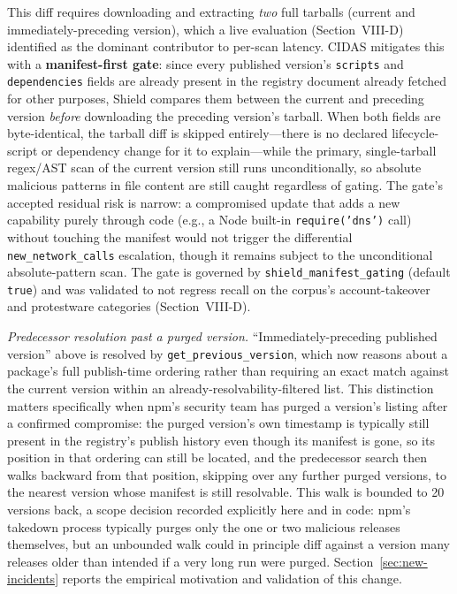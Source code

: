 \documentclass[journal]{IEEEtran}
\begin{document}
This diff requires downloading and extracting \emph{two} full tarballs (current and immediately-preceding
version), which a live evaluation (Section~VIII-D) identified as the dominant contributor to per-scan
latency. CIDAS mitigates this with a \textbf{manifest-first gate}: since every published version's
\texttt{scripts} and \texttt{dependencies} fields are already present in the registry document already
fetched for other purposes, Shield compares them between the current and preceding version \emph{before}
downloading the preceding version's tarball. When both fields are byte-identical, the tarball diff is skipped
entirely---there is no declared lifecycle-script or dependency change for it to explain---while the primary,
single-tarball regex/AST scan of the current version still runs unconditionally, so absolute malicious
patterns in file content are still caught regardless of gating. The gate's accepted residual risk is narrow:
a compromised update that adds a new capability purely through code (e.g., a Node built-in
\texttt{require('dns')} call) without touching the manifest would not trigger the differential
\texttt{new\_network\_calls} escalation, though it remains subject to the unconditional absolute-pattern
scan. The gate is governed by \texttt{shield\_manifest\_gating} (default \texttt{true}) and was validated to
not regress recall on the corpus's account-takeover and protestware categories (Section~VIII-D).

\emph{Predecessor resolution past a purged version.} ``Immediately-preceding published version'' above is
resolved by \texttt{get\_previous\_version}, which now reasons about a package's full publish-time ordering
rather than requiring an exact match against the current version within an already-resolvability-filtered
list. This distinction matters specifically when npm's security team has purged a version's listing after a
confirmed compromise: the purged version's own timestamp is typically still present in the registry's publish
history even though its manifest is gone, so its position in that ordering can still be located, and the
predecessor search then walks backward from that position, skipping over any further purged versions, to the
nearest version whose manifest is still resolvable. This walk is bounded to 20 versions back, a scope decision
recorded explicitly here and in code: npm's takedown process typically purges only the one or two malicious
releases themselves, but an unbounded walk could in principle diff against a version many releases older than
intended if a very long run were purged. Section~\ref{sec:new-incidents} reports the empirical motivation and
validation of this change.
\end{document}

